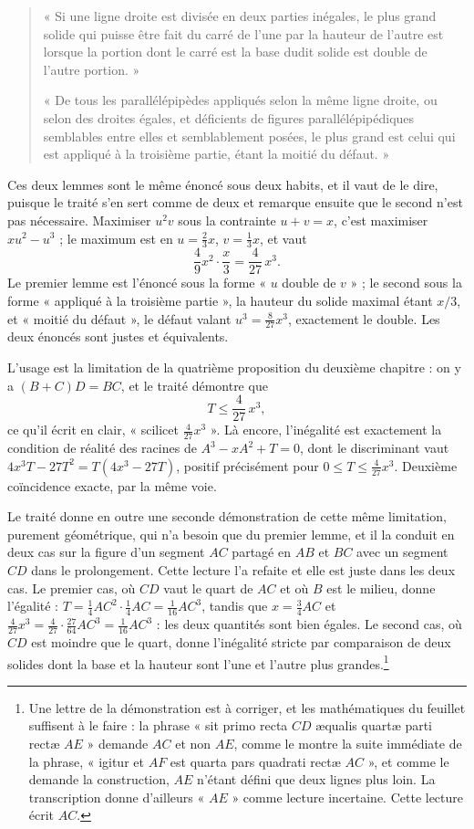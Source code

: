 \documentclass[11pt,a4paper]{article}
\begin{document}
\begin{quote}
« Si une ligne droite est divisée en deux parties inégales, le plus grand solide
qui puisse être fait du carré de l'une par la hauteur de l'autre est lorsque la
portion dont le carré est la base dudit solide est double de l'autre portion. »

« De tous les parallélépipèdes appliqués selon la même ligne droite, ou selon
des droites égales, et déficients de figures parallélépipédiques semblables
entre elles et semblablement posées, le plus grand est celui qui est appliqué à
la troisième partie, étant la moitié du défaut. »
\end{quote}

Ces deux lemmes sont le même énoncé sous deux habits, et il vaut de le dire,
puisque le traité s'en sert comme de deux et remarque ensuite que le second
n'est pas nécessaire. Maximiser $u^2 v$ sous la contrainte $u + v = x$, c'est
maximiser $xu^2 - u^3$ ; le maximum est en $u = \tfrac23 x$, $v = \tfrac13 x$, et
vaut
\[ \frac49 x^2 \cdot \frac{x}{3} = \frac{4}{27}\,x^3. \]
Le premier lemme est l'énoncé sous la forme « $u$ double de $v$ » ; le second
sous la forme « appliqué à la troisième partie », la hauteur du solide maximal
étant $x/3$, et « moitié du défaut », le défaut valant
$u^3 = \tfrac{8}{27}x^3$, exactement le double. Les deux énoncés sont justes et
équivalents.

L'usage est la limitation de la quatrième proposition du deuxième chapitre : on
y a $(B+C)D = BC$, et le traité démontre que
\[ T \le \frac{4}{27}\,x^3, \]
ce qu'il écrit en clair, « scilicet $\tfrac{4}{27}x^3$ ». Là encore, l'inégalité
est exactement la condition de réalité des racines de $A^3 - xA^2 + T = 0$, dont
le discriminant vaut $4x^3T - 27T^2 = T(4x^3 - 27T)$, positif précisément pour
$0 \le T \le \tfrac{4}{27}x^3$. Deuxième coïncidence exacte, par la même voie.

Le traité donne en outre une seconde démonstration de cette même limitation,
purement géométrique, qui n'a besoin que du premier lemme, et il la conduit en
deux cas sur la figure d'un segment $AC$ partagé en $AB$ et $BC$ avec un
segment $CD$ dans le prolongement. Cette lecture l'a refaite et elle est juste
dans les deux cas. Le premier cas, où $CD$ vaut le quart de $AC$ et où
$B$ est le milieu, donne l'égalité : $T = \tfrac14 AC^2 \cdot \tfrac14 AC =
\tfrac1{16}AC^3$, tandis que $x = \tfrac34 AC$ et $\tfrac4{27}x^3 =
\tfrac4{27}\cdot\tfrac{27}{64}AC^3 = \tfrac1{16}AC^3$ : les deux quantités sont
bien égales. Le second cas, où $CD$ est moindre que le quart, donne l'inégalité
stricte par comparaison de deux solides dont la base et la hauteur sont l'une et
l'autre plus grandes.\footnote{Une lettre de la démonstration est à corriger, et
les mathématiques du feuillet suffisent à le faire : la phrase « sit primo recta
$CD$ æqualis quartæ parti rectæ $AE$ » demande $AC$ et non $AE$, comme le montre
la suite immédiate de la phrase, « igitur et $AF$ est quarta pars quadrati rectæ
$AC$ », et comme le demande la construction, $AE$ n'étant défini que deux lignes
plus loin. La transcription donne d'ailleurs « $AE$ » comme lecture incertaine.
Cette lecture écrit $AC$.}
\end{document}
